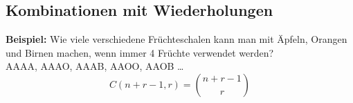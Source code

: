 \documentclass[12pt]{scrartcl}
\begin{document}
\subsection{Kombinationen mit Wiederholungen}
\textbf{Beispiel:} Wie viele verschiedene Früchteschalen kann man mit Äpfeln, Orangen und Birnen
machen, wenn immer 4 Früchte verwendet werden?\\
AAAA, AAAO, AAAB, AAOO, AAOB \dots\\

\[C(n+r-1, r) = \binom{n+r-1}{r}\]











% 
\end{document}
